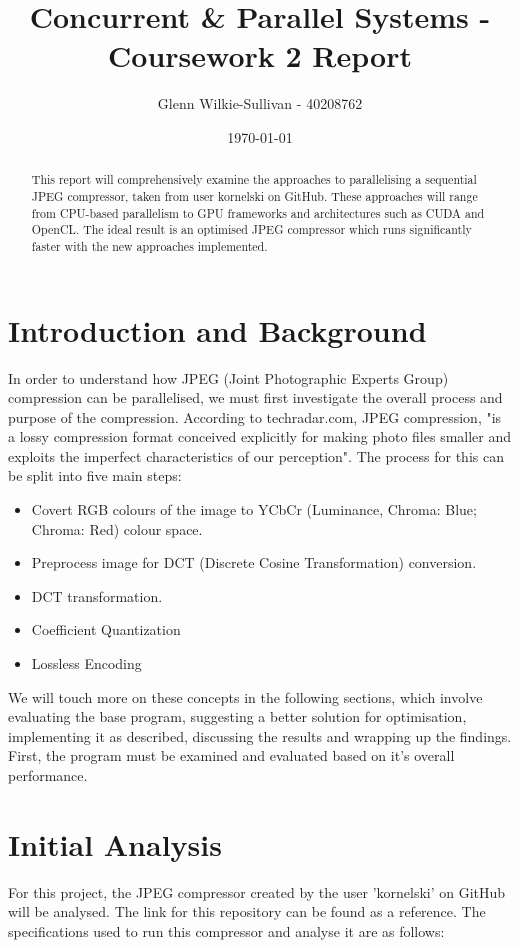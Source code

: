 \documentclass[12pt, a4paper]{article}
\title{\vspace{-3cm}Concurrent \& Parallel Systems - Coursework 2 Report}
\author{Glenn Wilkie-Sullivan - 40208762}
\date{\today}
\begin{document}
\maketitle

\begin{abstract}
\noindent This report will comprehensively examine the approaches to parallelising a sequential JPEG compressor, taken from user kornelski on GitHub. These approaches will range from CPU-based parallelism to GPU frameworks and architectures such as CUDA and OpenCL. The ideal result is an optimised JPEG compressor which runs significantly faster with the new approaches implemented.
\end{abstract}

\section{Introduction and Background}
In order to understand how JPEG (Joint Photographic Experts Group) compression can be parallelised, we must first investigate the overall process and purpose of the compression. According to techradar.com,  JPEG compression, "is a lossy compression format conceived explicitly for making photo files smaller and exploits the imperfect characteristics of our perception". The process for this can be split into five main steps:

\begin{itemize}
\item Covert RGB colours of the image to YCbCr (Luminance, Chroma: Blue; Chroma: Red) colour space.
\item Preprocess image for DCT (Discrete Cosine Transformation) conversion.
\item DCT transformation.
\item Coefficient Quantization
\item Lossless Encoding
\end{itemize}

We will touch more on these concepts in the following sections, which involve evaluating the base program, suggesting a better solution for optimisation, implementing it as described, discussing the results and wrapping up the findings. First, the program must be examined and evaluated based on it's overall performance.

\section{Initial Analysis}
For this project, the JPEG compressor created by the user 'kornelski' on GitHub will be analysed. The link for this repository can be found as a reference. The specifications used to run this compressor and analyse it are as follows:
\end{document}
